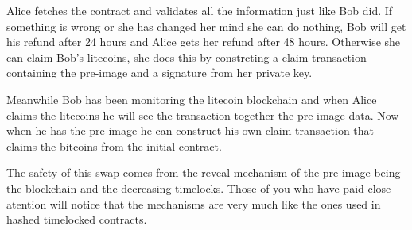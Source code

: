 Alice fetches the contract and validates all the information just like
Bob did. If something is wrong or she has changed her mind she can do nothing,
Bob will get his refund after 24 hours and Alice gets her refund after 48 hours.
Otherwise she can claim Bob's litecoins, she does this by constrcting a claim
transaction containing the pre-image and a signature from her private key. 

Meanwhile Bob has been monitoring the litecoin blockchain and when Alice claims the
litecoins he will see the transaction together the pre-image data. Now when he has
the pre-image he can construct his own claim transaction that claims the bitcoins 
from the initial contract. 

The safety of this swap comes from the reveal mechanism of the pre-image being
the blockchain and the decreasing timelocks. Those of you who have paid close
atention will notice that the mechanisms are very much like the ones used in hashed
timelocked contracts. 

